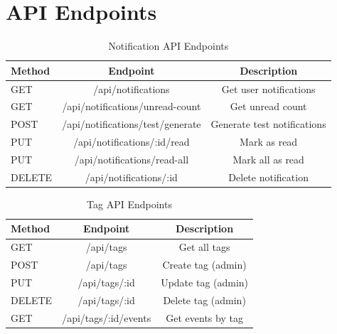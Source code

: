 \documentclass[12pt]{report}
\begin{document}
\section{API Endpoints}

\begin{table}[h!]
  \begin{center}
    \caption{Notification API Endpoints}
    \label{tab:api_notifications}
    \begin{tabular}{|l|c|c|} 
      \hline
      \textbf{Method} & \textbf{Endpoint} & \textbf{Description}\\
      \hline
      GET & /api/notifications & Get user notifications \\
      \hline
      GET & /api/notifications/unread-count & Get unread count \\
      \hline
      POST & /api/notifications/test/generate & Generate test notifications \\
      \hline
      PUT & /api/notifications/:id/read & Mark as read \\
      \hline
      PUT & /api/notifications/read-all & Mark all as read \\
      \hline
      DELETE & /api/notifications/:id & Delete notification \\
      \hline
    \end{tabular}
  \end{center}
\end{table}

\begin{table}[h!]
  \begin{center}
    \caption{Tag API Endpoints}
    \label{tab:api_tags}
    \begin{tabular}{|l|c|c|} 
      \hline
      \textbf{Method} & \textbf{Endpoint} & \textbf{Description}\\
      \hline
      GET & /api/tags & Get all tags \\
      \hline
      POST & /api/tags & Create tag (admin) \\
      \hline
      PUT & /api/tags/:id & Update tag (admin) \\
      \hline
      DELETE & /api/tags/:id & Delete tag (admin) \\
      \hline
      GET & /api/tags/:id/events & Get events by tag \\
      \hline
    \end{tabular}
  \end{center}
\end{table}
\end{document}
